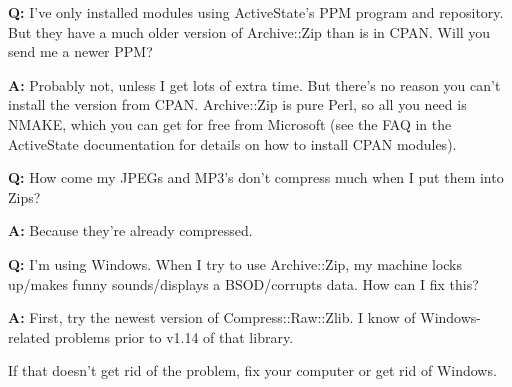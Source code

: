 \documentclass[]{article}
\let\realtextbf=\textbf
\renewcommand{\textbf}[1]{\textcolor{boldcolor}{\realtextbf{#1}}}
\begin{document}
\textbf{Q:} I've only installed modules using ActiveState's PPM program
and repository. But they have a much older version of Archive::Zip than
is in CPAN. Will you send me a newer PPM?

\textbf{A:} Probably not, unless I get lots of extra time. But there's
no reason you can't install the version from CPAN. Archive::Zip is pure
Perl, so all you need is NMAKE, which you can get for free from
Microsoft (see the FAQ in the ActiveState documentation for details on
how to install CPAN modules).


\textbf{Q:} How come my JPEGs and MP3's don't compress much when I put
them into Zips?

\textbf{A:} Because they're already compressed.


\textbf{Q:} I'm using Windows. When I try to use Archive::Zip, my
machine locks up/makes funny sounds/displays a BSOD/corrupts data. How
can I fix this?

\textbf{A:} First, try the newest version of Compress::Raw::Zlib. I know
of Windows-related problems prior to v1.14 of that library.

If that doesn't get rid of the problem, fix your computer or get rid of
Windows.

\end{document}
